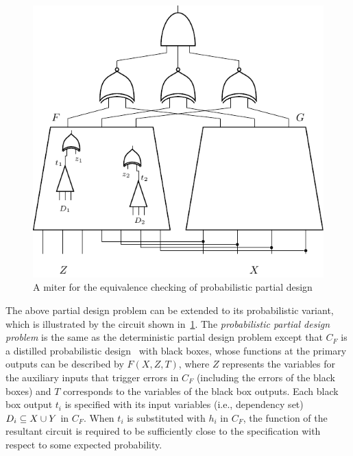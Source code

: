 \begin{figure}[t]
    \centering
    \includegraphics{fig/build/dssat-prob-miter.pdf}
    \caption{A miter for the equivalence checking of probabilistic partial design}
    \label{fig:dssat-prob-miter}
\end{figure}

The above partial design problem can be extended to its probabilistic variant,
which is illustrated by the circuit shown in~\cref{fig:dssat-prob-miter}.
The \textit{probabilistic partial design problem} is the same as the deterministic partial design problem except that
$C_F$ is a distilled probabilistic design~\cite{LeeTC18ProbDesign} with black boxes,
whose functions at the primary outputs can be described by $F(X,Z,T)$,
where $Z$ represents the variables for the auxiliary inputs that trigger errors in $C_F$
(including the errors of the black boxes) and
$T$ corresponds to the variables of the black box outputs.
Each black box output $t_i$ is specified with its input variables (i.e., dependency set)
$D_{i} \subseteq X \cup Y$ in $C_F$.
When $t_i$ is substituted with $h_i$ in $C_F$,
the function of the resultant circuit is required to be sufficiently close to the specification with respect to some expected probability.

